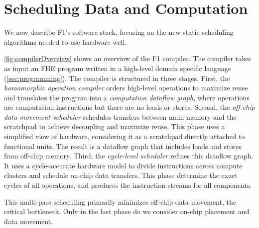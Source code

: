 \section{Scheduling Data and Computation}\label{sec:scheduler}

We now describe F1's software stack,
focusing on the new static scheduling algorithms
needed to use hardware well.

\figCompilerOverview

\autoref{fig:compilerOverview} shows an overview of the F1 compiler.
The compiler takes as input an FHE program written in a high-level domain specific language (\autoref{sec:programming}).
The compiler is structured in three stages.
First, the \emph{homomorphic operation compiler} 
orders high-level operations to maximize reuse and
translates the program into a \emph{computation dataflow graph},
where operations are computation instructions but there are no loads or stores.
Second, the \emph{off-chip data movement scheduler} %
schedules transfers between main memory and the scratchpad to achieve decoupling and maximize reuse.
This phase uses a simplified view of hardware, considering it as
a scratchpad directly attached to functional units. %
The result is a dataflow graph that includes loads and stores from off-chip memory.
Third, the \emph{cycle-level scheduler} refines this dataflow graph.
It uses a cycle-accurate hardware model to divide instructions across compute clusters
and schedule on-chip data transfers.
This phase determine the exact cycles of all operations, and produces the instruction streams for all components.

This multi-pass scheduling primarily minimizes off-chip data movement, the critical bottleneck.
Only in the last phase do we consider on-chip placement and data movement.

